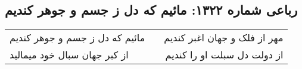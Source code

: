\begin{center}
\section*{رباعی شماره ۱۳۲۲: مائیم که دل ز جسم و جوهر کندیم}
\label{sec:1322}
\begin{longtable}{l p{0.5cm} r}
مائیم که دل ز جسم و جوهر کندیم
&&
مهر از فلک و جهان اغبر کندیم
\\
از کبر جهان سبال خود میمالید
&&
از دولت دل سبلت او را کندیم
\\
\end{longtable}
\end{center}
